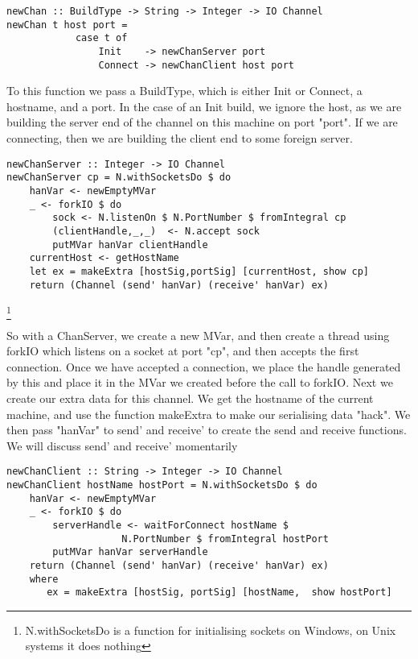 \begin{verbatim}
newChan :: BuildType -> String -> Integer -> IO Channel
newChan t host port =
            case t of
                Init    -> newChanServer port
                Connect -> newChanClient host port
\end{verbatim}
To this function we pass a BuildType, which is either Init or Connect, a hostname, and a port. In the case of an Init build, we ignore the host, as we are building the server end of the channel on this machine on port "port". If we are connecting, then we are building the client end to some foreign server.

\begin{verbatim}
newChanServer :: Integer -> IO Channel
newChanServer cp = N.withSocketsDo $ do
    hanVar <- newEmptyMVar
    _ <- forkIO $ do
        sock <- N.listenOn $ N.PortNumber $ fromIntegral cp
        (clientHandle,_,_)  <- N.accept sock
        putMVar hanVar clientHandle
    currentHost <- getHostName
    let ex = makeExtra [hostSig,portSig] [currentHost, show cp]
    return (Channel (send' hanVar) (receive' hanVar) ex)
\end{verbatim}
\footnote{N.withSocketsDo is a function for initialising sockets on Windows, on Unix systems it does nothing}

So with a ChanServer, we create a new MVar, and then create a thread using forkIO \cite{hack:io} which listens on a socket at port "cp", and then accepts the first connection. Once we have accepted a connection, we place the handle generated by this and place it in the MVar we created before the call to forkIO. Next we create our extra data for this channel. We get the hostname of the current machine, and use the function makeExtra to make our serialising data "hack". We then pass
"hanVar" to send' and receive' to create the send and receive functions.
We will discuss send' and receive' momentarily

\begin{verbatim}
newChanClient :: String -> Integer -> IO Channel
newChanClient hostName hostPort = N.withSocketsDo $ do
    hanVar <- newEmptyMVar
    _ <- forkIO $ do
        serverHandle <- waitForConnect hostName $ 
                    N.PortNumber $ fromIntegral hostPort
        putMVar hanVar serverHandle
    return (Channel (send' hanVar) (receive' hanVar) ex)
    where
       ex = makeExtra [hostSig, portSig] [hostName,  show hostPort]
\end{verbatim}

